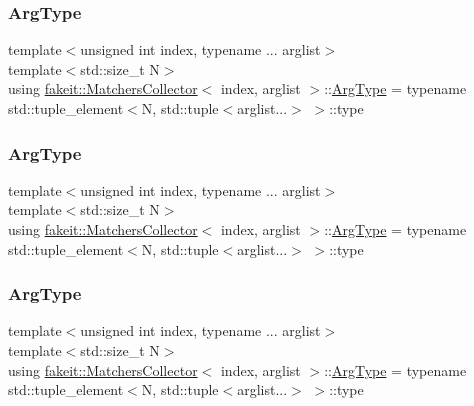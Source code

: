 \subsubsection{\texorpdfstring{ArgType}{ArgType}\hspace{0.1cm}{\footnotesize\ttfamily [4/9]}}
{\footnotesize\ttfamily template$<$unsigned int index, typename ... arglist$>$ \\
template$<$std\+::size\+\_\+t N$>$ \\
using \mbox{\hyperlink{classfakeit_1_1MatchersCollector}{fakeit\+::\+Matchers\+Collector}}$<$ index, arglist $>$\+::\mbox{\hyperlink{classfakeit_1_1MatchersCollector_aaba0fca8c182a698dda8ca056c29fe5f}{Arg\+Type}} =  typename std\+::tuple\+\_\+element$<$N, std\+::tuple$<$arglist...$>$ $>$\+::type}

\mbox{\label{classfakeit_1_1MatchersCollector_aaba0fca8c182a698dda8ca056c29fe5f}} 
\subsubsection{\texorpdfstring{ArgType}{ArgType}\hspace{0.1cm}{\footnotesize\ttfamily [5/9]}}
{\footnotesize\ttfamily template$<$unsigned int index, typename ... arglist$>$ \\
template$<$std\+::size\+\_\+t N$>$ \\
using \mbox{\hyperlink{classfakeit_1_1MatchersCollector}{fakeit\+::\+Matchers\+Collector}}$<$ index, arglist $>$\+::\mbox{\hyperlink{classfakeit_1_1MatchersCollector_aaba0fca8c182a698dda8ca056c29fe5f}{Arg\+Type}} =  typename std\+::tuple\+\_\+element$<$N, std\+::tuple$<$arglist...$>$ $>$\+::type}

\mbox{\label{classfakeit_1_1MatchersCollector_aaba0fca8c182a698dda8ca056c29fe5f}} 
\subsubsection{\texorpdfstring{ArgType}{ArgType}\hspace{0.1cm}{\footnotesize\ttfamily [6/9]}}
{\footnotesize\ttfamily template$<$unsigned int index, typename ... arglist$>$ \\
template$<$std\+::size\+\_\+t N$>$ \\
using \mbox{\hyperlink{classfakeit_1_1MatchersCollector}{fakeit\+::\+Matchers\+Collector}}$<$ index, arglist $>$\+::\mbox{\hyperlink{classfakeit_1_1MatchersCollector_aaba0fca8c182a698dda8ca056c29fe5f}{Arg\+Type}} =  typename std\+::tuple\+\_\+element$<$N, std\+::tuple$<$arglist...$>$ $>$\+::type}

